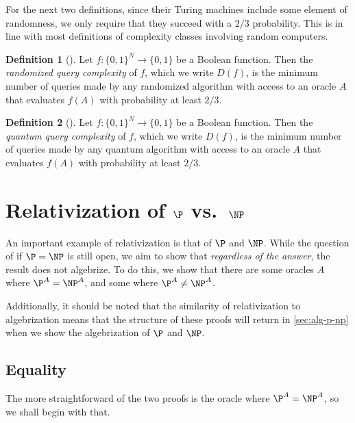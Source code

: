 \documentclass[english,12pt]{reedthesis}
\theoremstyle{plain}
\theoremstyle{definition}
\newtheorem{defn}[defn]{Definition}
\theoremstyle{remark}
\begin{document}
For the next two definitions, since their Turing machines include some element
of randomness, we only require that they succeed with a $2/3$ probability. This
is in line with most definitions of complexity classes involving random
computers.

\begin{defn}[{\cite[17]{AW09}}]\label{def:rand-qc}
  Let $f\colon \{0, 1\}^{N} \rightarrow \{0, 1\}$ be a Boolean function. Then the
  \emph{randomized query complexity} of $f$, which we write $D(f)$, is the
  minimum number of queries made by any randomized algorithm with access to an
  oracle $A$ that evaluates $f(A)$ with probability at least $2/3$.
\end{defn}


\begin{defn}[{\cite[17]{AW09}}]\label{def:quant-qc}
  Let $f\colon \{0, 1\}^{N} \rightarrow \{0, 1\}$ be a Boolean function. Then the
  \emph{quantum query complexity} of $f$, which we write $D(f)$, is the minimum
  number of queries made by any quantum algorithm with access to an oracle $A$
  that evaluates $f(A)$ with probability at least $2/3$.
\end{defn}

\section{Relativization of $\P$ vs.\ $\NP$}\label{sec:rel-p-np}

An important example of relativization is that of $\P$ and $\NP$. While the
question of if $\P = \NP$ is still open, we aim to show that \emph{regardless of
the answer}, the result does not algebrize. To do this, we show that there are
some oracles $A$ where $\P^{A} = \NP^{A}$, and some where $\P^{A} \ne \NP^{A}$.

Additionally, it should be noted that the similarity of relativization to
algebrization means that the structure of these proofs will return in
\cref{sec:alg-p-np} when we show the algebrization of $\P$ and $\NP$.

\subsection{Equality}

The more straightforward of the two proofs is the oracle where
$\P^{A} = \NP^{A}$, so we shall begin with that.
\end{document}
